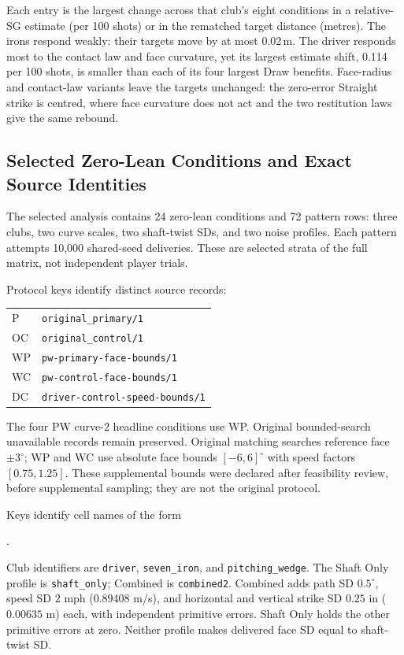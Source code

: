 \documentclass[11pt,letterpaper]{article}
\begin{document}


Each entry is the largest change across that club's eight conditions in a
relative-SG estimate (per 100 shots) or in the rematched target distance
(metres). The irons respond weakly: their targets move by at most 0.02\,m.
The driver responds most to the contact law and face curvature, yet its
largest estimate shift, 0.114 per 100 shots, is smaller than each of its four
largest Draw benefits. Face-radius and contact-law variants leave the targets
unchanged: the zero-error Straight strike is centred, where face curvature
does not act and the two restitution laws give the same rebound.

\subsection{Selected Zero-Lean Conditions and Exact Source Identities}

The selected analysis contains 24 zero-lean conditions and 72 pattern rows: three clubs, two curve scales, two shaft-twist SDs, and two noise profiles. Each pattern attempts 10,000 shared-seed deliveries. These are selected strata of the full matrix, not independent player trials.

Protocol keys identify distinct source records:
\begin{center}\small
\begin{tabular}{@{}ll@{}}
P & \texttt{original\_primary/1} \\
OC & \texttt{original\_control/1} \\
WP & \texttt{pw-primary-face-bounds/1} \\
WC & \texttt{pw-control-face-bounds/1} \\
DC & \texttt{driver-control-speed-bounds/1} \\
\end{tabular}
\end{center}

The four PW curve-$2$ headline conditions use WP. Original bounded-search unavailable records remain preserved. Original matching searches reference face $\pm3^\circ$; WP and WC use absolute face bounds $[-6,6]^\circ$ with speed factors $[0.75,1.25]$. These supplemental bounds were declared after feasibility review, before supplemental sampling; they are not the original protocol.

Keys identify cell names of the form
\begin{center}\texttt{}.\end{center}
\noindent Club identifiers are \texttt{driver}, \texttt{seven\_iron}, and \texttt{pitching\_wedge}. The Shaft Only profile is \texttt{shaft\_only}; Combined is \texttt{combined2}. Combined adds path SD $0.5^\circ$, speed SD $2$ mph ($0.89408$ m/s), and horizontal and vertical strike SD $0.25$ in ($0.00635$ m) each, with independent primitive errors. Shaft Only holds the other primitive errors at zero. Neither profile makes delivered face SD equal to shaft-twist SD.
\end{document}
